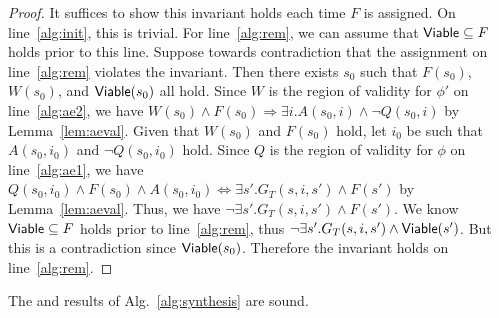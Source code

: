 \begin{proof}
  It suffices to show this invariant holds each time $F$ is assigned.
  On line~\ref{alg:init}, this is trivial. For line~\ref{alg:rem}, we can assume that
  ${\mathsf {Viable}} \subseteq F$ holds prior to this line. Suppose towards
  contradiction that the assignment on line~\ref{alg:rem} violates the invariant.
  Then there exists $s_0$ such that $F(s_0)$, $W(s_0)$, and
  ${\mathsf {Viable}}(s_0)$ all hold. Since $W$ is the region of validity for
  $\phi'$ on line~\ref{alg:ae2}, we have
  $W(s_0) \land F(s_0) \Rightarrow \exists i. A(s_0, i) \land \neg Q(s_0, i)$
  by Lemma~\ref{lem:aeval}. Given that $W(s_0)$ and $F(s_0)$ hold, let $i_0$
  be such that $A(s_0, i_0)$ and $\neg Q(s_0, i_0)$ hold. Since $Q$ is the
  region of validity for $\phi$ on line~\ref{alg:ae1}, we have
  $Q(s_0, i_0) \land F(s_0) \land A(s_0, i_0) \Leftrightarrow \exists s'. G_T(s, i, s')
  \land F(s')$ by Lemma~\ref{lem:aeval}. Thus, we have
  $\neg \exists s'. G_T(s, i, s') \land F(s')$. We know
  ${\mathsf {Viable}} \subseteq F$ holds prior to line~\ref{alg:rem}, thus
  $\neg \exists s'. G_T(s, i, s') \land {\mathsf {Viable}}(s')$. But this is a
  contradiction since ${\mathsf {Viable}}(s_0)$. Therefore the invariant holds on
  line~\ref{alg:rem}.
\end{proof}


\begin{theorem}
  The \realizable and \unrealizable results of
  Alg.~\ref{alg:synthesis} are sound.
\end{theorem}


